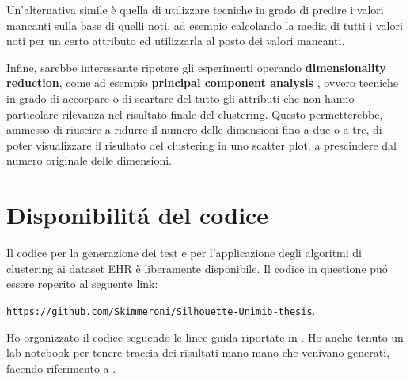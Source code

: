 \documentclass[a4paper, 12pt]{report}
\begin{document}
		Un'alternativa simile è quella di utilizzare tecniche in grado di
		predire i valori mancanti sulla base di quelli noti, ad esempio
		calcolando la media di tutti i valori noti per un certo attributo
		ed utilizzarla al posto dei valori mancanti.

		Infine, sarebbe interessante ripetere gli esperimenti operando
		\textbf{dimensionality reduction}, come ad esempio \textbf{principal
		component analysis} \cite{Hotelling1933AnalysisOA}, ovvero tecniche
		in grado di accorpare o di scartare del tutto gli attributi che non
		hanno particolare rilevanza nel risultato finale del clustering.
		Questo permetterebbe, ammesso di riuscire a ridurre il numero delle
		dimensioni fino a due o a tre, di poter visualizzare il risultato
		del clustering in uno scatter plot, a prescindere dal numero originale
		delle dimensioni.

	\chapter*{Disponibilitá del codice}

		Il codice per la generazione dei test e per l'applicazione degli
		algoritmi di clustering ai dataset EHR è liberamente disponibile.
		Il codice in questione puó essere reperito al seguente link:

		\texttt{https://github.com/Skimmeroni/Silhouette-Unimib-thesis}.

		Ho organizzato il codice seguendo le linee guida riportate in
		\cite{10.1371/journal.pcbi.1000424}. Ho anche tenuto un lab
		notebook per tenere traccia dei risultati mano mano che venivano
		generati, facendo riferimento a \cite{10.1371/journal.pcbi.1004385}.

	\printbibliography
\end{document}
